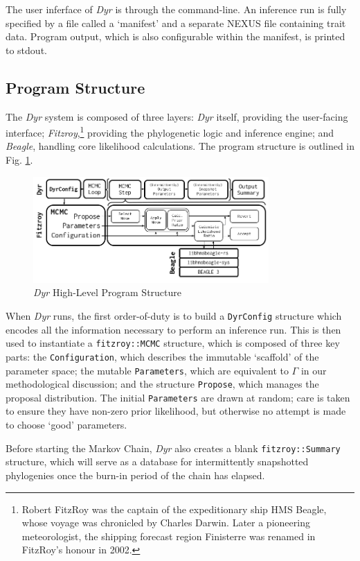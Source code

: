 \documentclass[10pt,journal,compsoc]{IEEEtran}
\begin{document}
The user inferface of \textit{Dyr} is through the command-line. An inference run is fully specified by a file called a `manifest' and a separate NEXUS file containing trait data. Program output, which is also configurable within the manifest, is printed to stdout.

\subsection{Program Structure}

The \textit{Dyr} system is composed of three layers: \textit{Dyr} itself, providing the user-facing interface; \textit{Fitzroy},\footnote{Robert FitzRoy was the captain of the expeditionary ship HMS Beagle, whose voyage was chronicled by Charles Darwin. Later a pioneering meteorologist, the shipping forecast region Finisterre was renamed in FitzRoy's honour in 2002.} providing the phylogenetic logic and inference engine; and \textit{Beagle}, handling core likelihood calculations. The program structure is outlined in Fig. \ref{fig:program}.
\begin{figure}
\caption{\textit{Dyr} High-Level Program Structure}\label{fig:program}
\vspace{0.2cm}
\includegraphics[width=9cm,center]{progdiagram}
\end{figure}

When \textit{Dyr} runs, the first order-of-duty is to build a \texttt{DyrConfig} structure which encodes all the information necessary to perform an inference run. This is then used to instantiate a \texttt{fitzroy::MCMC} structure, which is composed of three key parts: the \texttt{Configuration}, which describes the immutable `scaffold' of the parameter space; the mutable \texttt{Parameters}, which are equivalent to $\Gamma$ in our methodological discussion; and the structure \texttt{Propose}, which manages the proposal distribution. The initial \texttt{Parameters} are drawn at random; care is taken to ensure they have non-zero prior likelihood, but otherwise no attempt is made to choose `good' parameters.

Before starting the Markov Chain, \textit{Dyr} also creates a blank \texttt{fitzroy::Summary} structure, which will serve as a database for intermittently snapshotted phylogenies once the burn-in period of the chain has elapsed. 
\end{document}
